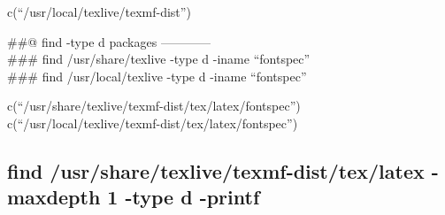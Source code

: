 \documentclass[
]{article}
\newenvironment{Shaded}{\begin{snugshade}}{\end{snugshade}}
\newcommand{\AttributeTok}[1]{\textcolor[rgb]{0.13,0.29,0.53}{#1}}
\newcommand{\ConstantTok}[1]{\textcolor[rgb]{0.56,0.35,0.01}{#1}}
\newcommand{\ControlFlowTok}[1]{\textcolor[rgb]{0.13,0.29,0.53}{\textbf{#1}}}
\newcommand{\DecValTok}[1]{\textcolor[rgb]{0.00,0.00,0.81}{#1}}
\newcommand{\FunctionTok}[1]{\textcolor[rgb]{0.13,0.29,0.53}{\textbf{#1}}}
\newcommand{\NormalTok}[1]{#1}
\newcommand{\SpecialCharTok}[1]{\textcolor[rgb]{0.81,0.36,0.00}{\textbf{#1}}}
\newcommand{\StringTok}[1]{\textcolor[rgb]{0.31,0.60,0.02}{#1}}
\begin{document}
c(``/usr/local/texlive/texmf-dist'')

\#\#@ find -type d packages ------------\\
\#\#\# find /usr/share/texlive -type d -iname ``fontspec''\\
\#\#\# find /usr/local/texlive -type d -iname ``fontspec''

\begin{Shaded}
\end{Shaded}

c(``/usr/share/texlive/texmf-dist/tex/latex/fontspec'')
c(``/usr/local/texlive/texmf-dist/tex/latex/fontspec'')

\hypertarget{find-usrsharetexlivetexmf-disttexlatex--maxdepth-1--type-d--printf}{%
\subsection{find /usr/share/texlive/texmf-dist/tex/latex -maxdepth 1
-type d
-printf}\label{find-usrsharetexlivetexmf-disttexlatex--maxdepth-1--type-d--printf}}
\end{document}
